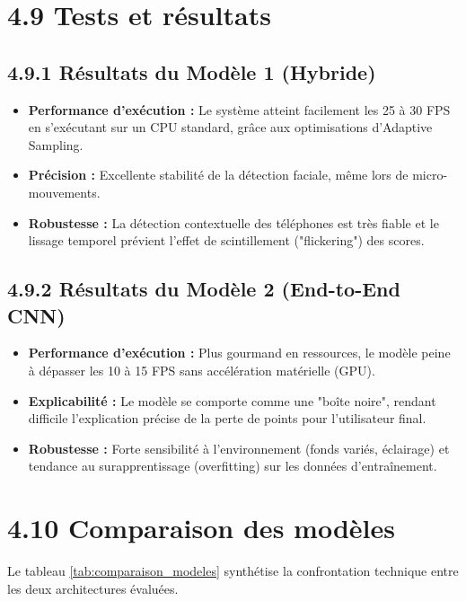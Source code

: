 
\section{4.9 Tests et résultats}

\subsection{4.9.1 Résultats du Modèle 1 (Hybride)}
\begin{itemize}
    \item \textbf{Performance d'exécution :} Le système atteint facilement les 25 à 30 FPS en s'exécutant sur un CPU standard, grâce aux optimisations d'Adaptive Sampling.
    \item \textbf{Précision :} Excellente stabilité de la détection faciale, même lors de micro-mouvements.
    \item \textbf{Robustesse :} La détection contextuelle des téléphones est très fiable et le lissage temporel prévient l'effet de scintillement ("flickering") des scores.
\end{itemize}

\subsection{4.9.2 Résultats du Modèle 2 (End-to-End CNN)}
\begin{itemize}
    \item \textbf{Performance d'exécution :} Plus gourmand en ressources, le modèle peine à dépasser les 10 à 15 FPS sans accélération matérielle (GPU).
    \item \textbf{Explicabilité :} Le modèle se comporte comme une "boîte noire", rendant difficile l'explication précise de la perte de points pour l'utilisateur final.
    \item \textbf{Robustesse :} Forte sensibilité à l'environnement (fonds variés, éclairage) et tendance au surapprentissage (overfitting) sur les données d'entraînement.
\end{itemize}


\section{4.10 Comparaison des modèles}

Le tableau \ref{tab:comparaison_modeles} synthétise la confrontation technique entre les deux architectures évaluées.

